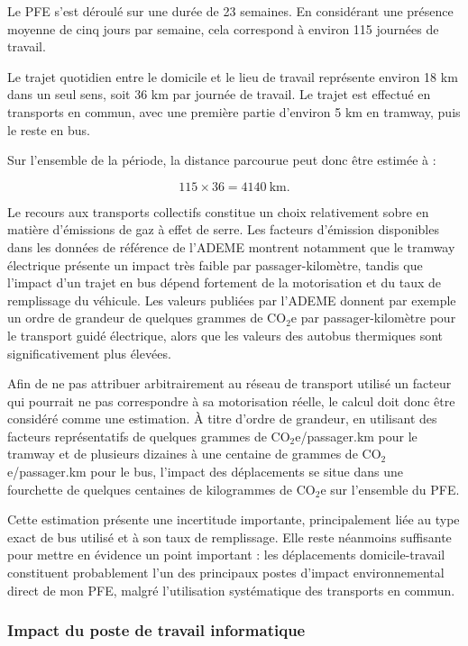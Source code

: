 \documentclass[12pt,a4paper,twoside]{article}
\begin{document}
Le PFE s'est déroulé sur une durée de 23 semaines. En considérant une présence moyenne de cinq jours par semaine, cela correspond à environ 115 journées de travail.

Le trajet quotidien entre le domicile et le lieu de travail représente environ 18 km dans un seul sens, soit 36 km par journée de travail. Le trajet est effectué en transports en commun, avec une première partie d'environ 5 km en tramway, puis le reste en bus.

Sur l'ensemble de la période, la distance parcourue peut donc être estimée à :

$$
115 \times 36 = 4140\ \text{km}.
$$

Le recours aux transports collectifs constitue un choix relativement sobre en matière d'émissions de gaz à effet de serre. Les facteurs d'émission disponibles dans les données de référence de l'ADEME montrent notamment que le tramway électrique présente un impact très faible par passager-kilomètre, tandis que l'impact d'un trajet en bus dépend fortement de la motorisation et du taux de remplissage du véhicule. Les valeurs publiées par l'ADEME donnent par exemple un ordre de grandeur de quelques grammes de CO$_2$e par passager-kilomètre pour le transport guidé électrique, alors que les valeurs des autobus thermiques sont significativement plus élevées.

Afin de ne pas attribuer arbitrairement au réseau de transport utilisé un facteur qui pourrait ne pas correspondre à sa motorisation réelle, le calcul doit donc être considéré comme une estimation. À titre d'ordre de grandeur, en utilisant des facteurs représentatifs de quelques grammes de CO$_2$e/passager.km pour le tramway et de plusieurs dizaines à une centaine de grammes de CO$_2$e/passager.km pour le bus, l'impact des déplacements se situe dans une fourchette de quelques centaines de kilogrammes de CO$_2$e sur l'ensemble du PFE.

Cette estimation présente une incertitude importante, principalement liée au type exact de bus utilisé et à son taux de remplissage. Elle reste néanmoins suffisante pour mettre en évidence un point important : les déplacements domicile-travail constituent probablement l'un des principaux postes d'impact environnemental direct de mon PFE, malgré l'utilisation systématique des transports en commun.

\subsubsection{Impact du poste de travail informatique}
\label{subsubsec:rse_ordinateur}
\end{document}
